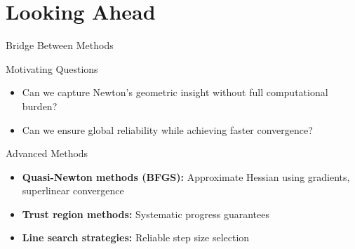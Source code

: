 \documentclass[aspectratio=1610]{beamer}
\begin{document}
\section{Looking Ahead}

\begin{frame}{Bridge Between Methods}
  \begin{block}{Motivating Questions}
    \begin{itemize}
      \item Can we capture Newton's geometric insight without full computational burden?
      \item Can we ensure global reliability while achieving faster convergence?
    \end{itemize}
  \end{block}
  
  \vspace{0.5cm}
  \begin{block}{Advanced Methods}
    \begin{itemize}
      \item \textbf{Quasi-Newton methods (BFGS):} Approximate Hessian using gradients, superlinear convergence
      \item \textbf{Trust region methods:} Systematic progress guarantees
      \item \textbf{Line search strategies:} Reliable step size selection
    \end{itemize}
  \end{block}
\end{frame}
\end{document}
